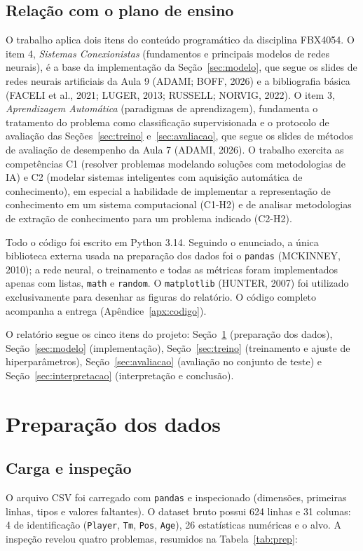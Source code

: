 \documentclass[11pt,a4paper]{article}
\begin{document}
\subsection*{Relação com o plano de ensino}
O trabalho aplica dois itens do conteúdo programático da disciplina FBX4054. O item 4, \emph{Sistemas
Conexionistas} (fundamentos e principais modelos de redes neurais), é a base da implementação da
Seção~\ref{sec:modelo}, que segue os slides de redes neurais artificiais da Aula 9 (ADAMI; BOFF, 2026) e a
bibliografia básica (FACELI et al., 2021; LUGER, 2013; RUSSELL; NORVIG, 2022). O item 3, \emph{Aprendizagem
Automática} (paradigmas de aprendizagem), fundamenta o tratamento do problema como classificação
supervisionada e o protocolo de avaliação das Seções~\ref{sec:treino} e~\ref{sec:avaliacao}, que segue os
slides de métodos de avaliação de desempenho da Aula 7 (ADAMI, 2026). O trabalho exercita as competências
C1 (resolver problemas modelando soluções com metodologias de IA) e C2 (modelar sistemas inteligentes com
aquisição automática de conhecimento), em especial a habilidade de implementar a representação de
conhecimento em um sistema computacional (C1-H2) e de analisar metodologias de extração de conhecimento
para um problema indicado (C2-H2).

Todo o código foi escrito em Python 3.14. Seguindo o enunciado, a única biblioteca externa usada na
preparação dos dados foi o \texttt{pandas} (MCKINNEY, 2010); a rede neural, o treinamento e todas as métricas foram
implementados apenas com listas, \texttt{math} e \texttt{random}. O \texttt{matplotlib} (HUNTER, 2007) foi
utilizado exclusivamente para desenhar as figuras do relatório. O código completo acompanha a entrega
(Apêndice~\ref{apx:codigo}).

O relatório segue os cinco itens do projeto: Seção~\ref{sec:dados} (preparação dos dados),
Seção~\ref{sec:modelo} (implementação), Seção~\ref{sec:treino} (treinamento e ajuste de
hiperparâmetros), Seção~\ref{sec:avaliacao} (avaliação no conjunto de teste) e
Seção~\ref{sec:interpretacao} (interpretação e conclusão).

\section{Preparação dos dados}\label{sec:dados}

\subsection{Carga e inspeção}
O arquivo CSV foi carregado com \texttt{pandas} e inspecionado (dimensões, primeiras linhas, tipos e
valores faltantes). O dataset bruto possui 624 linhas e 31 colunas: 4 de identificação
(\texttt{Player}, \texttt{Tm}, \texttt{Pos}, \texttt{Age}), 26 estatísticas numéricas e o alvo.
A inspeção revelou quatro problemas, resumidos na Tabela~\ref{tab:prep}:
\end{document}
